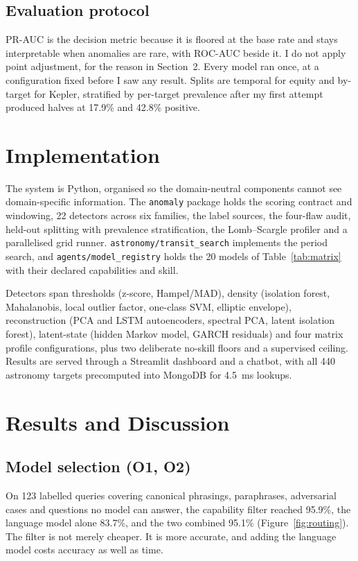 \documentclass[11pt,a4paper]{article}
\begin{document}
\subsection{Evaluation protocol}
PR-AUC is the decision metric because it is floored at the base rate and stays
interpretable when anomalies are rare, with ROC-AUC beside it. I do not apply
point adjustment, for the reason in Section~2. Every model ran once, at a
configuration fixed before I saw any result. Splits are temporal for equity and
by-target for Kepler, stratified by per-target prevalence after my first
attempt produced halves at 17.9\% and 42.8\% positive.

\section{Implementation}

The system is Python, organised so the domain-neutral components cannot see
domain-specific information. The \texttt{anomaly} package holds the scoring
contract and windowing, 22 detectors across six families, the label sources,
the four-flaw audit, held-out splitting with prevalence stratification, the
Lomb--Scargle profiler and a parallelised grid runner.
\texttt{astronomy/transit\_search} implements the period search, and
\texttt{agents/model\_registry} holds the 20 models of
Table~\ref{tab:matrix} with their declared capabilities and skill.

Detectors span thresholds (z-score, Hampel/MAD), density (isolation forest,
Mahalanobis, local outlier factor, one-class SVM, elliptic envelope),
reconstruction (PCA and LSTM autoencoders, spectral PCA, latent isolation
forest), latent-state (hidden Markov model, GARCH residuals) and four matrix
profile configurations, plus two deliberate no-skill floors and a supervised
ceiling. Results are served through a Streamlit dashboard and a chatbot, with
all 440 astronomy targets precomputed into MongoDB for 4.5~ms lookups.

\section{Results and Discussion}

\subsection{Model selection (O1, O2)}
On 123 labelled queries covering canonical phrasings, paraphrases, adversarial
cases and questions no model can answer, the capability filter reached 95.9\%,
the language model alone 83.7\%, and the two combined 95.1\%
(Figure~\ref{fig:routing}). The filter is not merely cheaper. It is more
accurate, and adding the language model costs accuracy as well as time.
\end{document}
